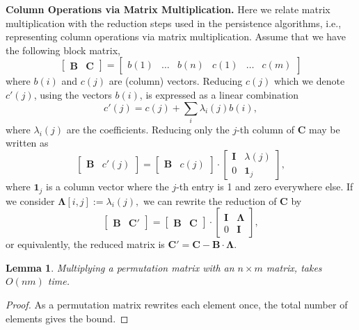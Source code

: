 \documentclass[10pt,a4paper]{article}
\newtheorem{lemma}[theorem]{Lemma}
\newtheorem{observation}[theorem]{Observation}
\newcommand{\matsize}[2]{#1\times #2}
\newcommand{\mat}[1]{\mathbf{#1}}
\renewcommand{\paragraph}[1]{\noindent\textbf{#1.}}
\begin{document}
\paragraph{\textbf{Column Operations via Matrix Multiplication}}
    Here we relate matrix multiplication with the reduction steps used in the persistence algorithms, i.e.,  representing column operations via matrix multiplication.  Assume that we have the following block matrix,
\[
\left[
    \begin{array}{c|c}\mat{B} &\mat{C}\end{array} \right] = \left[\begin{array}{ccc|ccc}b(1) &\ldots& b(n) &c(1) &\ldots & c(m) \end{array}\right]
\]
where $b(i)$ and $c(j)$ are (column) vectors. Reducing $c(j)$ which we denote $c'(j)$, using the vectors $b(i)$, is expressed as a linear combination
\[c'(j) = c(j) + \sum_i \lambda_i(j) b(i),\]
where $\lambda_i(j)$ are the coefficients. 
Reducing only the $j$-th column of $\mat{C}$ may be written as
\[\begin{bmatrix}\mat{B} & c'(j) \end{bmatrix} = 
\begin{bmatrix}\mat{B} &  c(j) \end{bmatrix}  \cdot  \begin{bmatrix}\mat{I} & \lambda(j) \\ 0 & \mat{1}_j  \end{bmatrix},
\]
where $\mat{1}_j$ is a column vector where the $j$-th entry is 1 and zero  everywhere else. If we consider
$\mat{\Lambda}[i,j] := 
\lambda_i(j),$
we can rewrite the reduction of $\mat{C}$ by
\[\begin{bmatrix}\mat{B} & \mat{C}' \end{bmatrix} = 
\begin{bmatrix}\mat{B} &  \mat{C} \end{bmatrix}  \cdot  \begin{bmatrix}\mat{I} & \mat{\Lambda}\\ 0 & \mat{I}  \end{bmatrix},
\]
or equivalently, the reduced matrix is %
$\mat{C}' =  \mat{C} - \mat{B} \cdot \mat{\Lambda}.$
\begin{lemma}\label{lem:perm}
    Multiplying a permutation matrix with an $\matsize{n}{m}$ matrix, takes $O(nm)$ time.
\end{lemma}
\begin{proof}
As a permutation matrix rewrites each element once, the total number of elements gives the bound. 
\end{proof}
\end{document}
